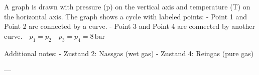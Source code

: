 A graph is drawn with pressure (p) on the vertical axis and temperature (T) on the horizontal axis. The graph shows a cycle with labeled points:  
- Point 1 and Point 2 are connected by a curve.  
- Point 3 and Point 4 are connected by another curve.  
- \( p_1 = p_2 \)  
- \( p_3 = p_4 = 8 \, \text{bar} \)  

Additional notes:  
- Zustand 2: Nassgas (wet gas)  
- Zustand 4: Reingas (pure gas)  

---